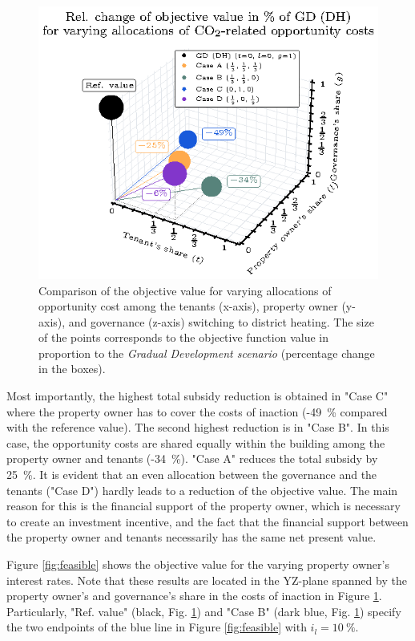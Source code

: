 \begin{figure}[h]
	\centering
	\includegraphics[width=0.8\linewidth]{figures/4_Results/fig_3d_plot/3d.eps}
	\caption{Comparison of the objective value for varying allocations of opportunity cost among the tenants (x-axis), property owner (y-axis), and governance (z-axis) switching to district heating. The size of the points corresponds to the objective function value in proportion to the \textit{Gradual Development scenario} (percentage change in the boxes).}
	\label{fig:3dplot}
\end{figure}

Most importantly, the highest total subsidy reduction is obtained in "Case C" where the property owner has to cover the costs of inaction (-\SI{49}{\%} compared with the reference value). The second highest reduction is in "Case B". In this case, the opportunity costs are shared equally within the building among the property owner and tenants (-\SI{34}{\%}). "Case A" reduces the total subsidy by \SI{25}{\%}.  It is evident that an even allocation between the governance and the tenants ("Case D") hardly leads to a reduction of the objective value. The main reason for this is the financial support of the property owner, which is necessary to create an investment incentive, and the fact that the financial support between the property owner and tenants necessarily has the same net present value.\vspace{0.5cm}

Figure \ref{fig:feasible} shows the objective value for the varying property owner's interest rates. Note that these results are located in the YZ-plane spanned by the property owner's and governance's share in the costs of inaction in Figure \ref{fig:3dplot}. Particularly, "Ref. value" (black, Fig. \ref{fig:3dplot}) and "Case B" (dark blue, Fig. \ref{fig:3dplot}) specify the two endpoints of the blue line in Figure \ref{fig:feasible} with $i_l=\SI{10}{\%}$. 

